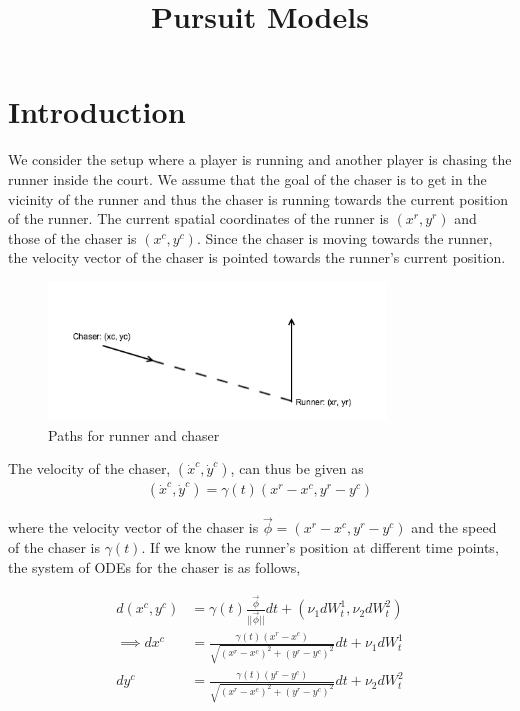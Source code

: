 \documentclass[a4paper,11pt]{article}
\begin{document}
\pagestyle{empty}
\title{Pursuit Models}
\section{Introduction}
We consider the setup where a player is running and another player is chasing the runner inside the court. We assume that the goal of the chaser is to get in the vicinity of the runner and thus the chaser is running towards the current position of the runner. The current spatial coordinates of the runner is $(x^{r}, y^{r})$ and those of the chaser is $(x^{c}, y^{c})$. Since the chaser is moving towards the runner, the velocity vector of the chaser is pointed towards the runner's current position.

\begin{figure}[H]
\centering
\includegraphics[width=0.8\textwidth]{pursuit.png}
\caption{Paths for runner and chaser}
\end{figure}

The velocity of the chaser, $(\dot{x}^c, \dot{y}^c)$, can thus be given as
\begin{align*}
(\dot{x}^c, \dot{y}^c) = \gamma(t) (x^{r} - x^{c}, y^{r} - y^{c})
\end{align*}

where the velocity vector of the chaser is $\vec{\phi} = (x^{r} - x^{c}, y^{r} - y^{c})$ and the speed of the chaser is $\gamma(t)$. If we know the runner's position at different time points, the system of ODEs for the chaser is as follows,

\begin{align*}
d(x^{c}, y^{c}) & = \gamma(t) \frac{\vec{\phi}}{||\vec{\phi}||} dt + (\nu_1 dW^1_t, \nu_2 dW^2_t) \\
\implies d x^{c} & = \frac{\gamma(t) (x^{r} - x^{c})}{\sqrt{(x^{r} - x^{c})^2 + (y^{r} - y^{c})^2}}dt + \nu_1 dW^1_t \\
d y^{c} & = \frac{\gamma(t) (y^{r} - y^{c})}{\sqrt{(x^{r} - x^{c})^2 + (y^{r} - y^{c})^2}}dt + \nu_2 dW^2_t
\end{align*}
\end{document}

